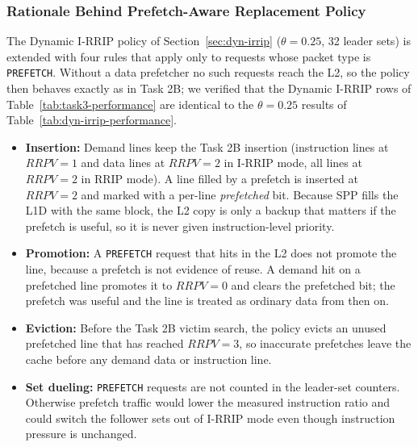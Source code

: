 \documentclass[a4paper, 11pt]{article}
\begin{document}
\subsubsection{Rationale Behind Prefetch-Aware Replacement Policy}
The Dynamic I-RRIP policy of Section~\ref{sec:dyn-irrip} ($\theta = 0.25$, 32 leader sets) is extended with four rules that apply only to requests whose packet type is \texttt{PREFETCH}. Without a data prefetcher no such requests reach the L2, so the policy then behaves exactly as in Task 2B; we verified that the Dynamic I-RRIP rows of Table~\ref{tab:task3-performance} are identical to the $\theta = 0.25$ results of Table~\ref{tab:dyn-irrip-performance}.
\begin{itemize}
    \item \textbf{Insertion:} Demand lines keep the Task 2B insertion (instruction lines at $RRPV = 1$ and data lines at $RRPV = 2$ in I-RRIP mode, all lines at $RRPV = 2$ in RRIP mode). A line filled by a prefetch is inserted at $RRPV = 2$ and marked with a per-line \emph{prefetched} bit. Because SPP fills the L1D with the same block, the L2 copy is only a backup that matters if the prefetch is useful, so it is never given instruction-level priority.
    \item \textbf{Promotion:} A \texttt{PREFETCH} request that hits in the L2 does not promote the line, because a prefetch is not evidence of reuse. A demand hit on a prefetched line promotes it to $RRPV = 0$ and clears the prefetched bit; the prefetch was useful and the line is treated as ordinary data from then on.
    \item \textbf{Eviction:} Before the Task 2B victim search, the policy evicts an unused prefetched line that has reached $RRPV = 3$, so inaccurate prefetches leave the cache before any demand data or instruction line.
    \item \textbf{Set dueling:} \texttt{PREFETCH} requests are not counted in the leader-set counters. Otherwise prefetch traffic would lower the measured instruction ratio and could switch the follower sets out of I-RRIP mode even though instruction pressure is unchanged.
\end{itemize}
\end{document}
